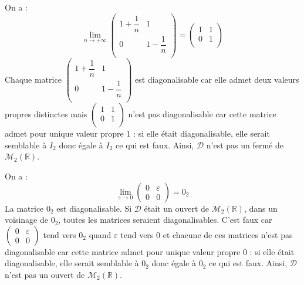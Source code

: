 \documentclass[a4paper,10pt]{report}
\begin{document}
\corr On a :
$$ \lim_{n \rightarrow + \infty} \begin{pmatrix}
1+ \dfrac{1}{n} & 1 \\
0 & 1- \dfrac{1}{n} \\
\end{pmatrix} = \begin{pmatrix}
1 & 1 \\
0 & 1 \\
\end{pmatrix}$$
Chaque matrice $\begin{pmatrix}
1+ \dfrac{1}{n} & 1 \\
0 & 1- \dfrac{1}{n} \\
\end{pmatrix}$ est diagonalisable car elle admet deux valeurs propres distinctes mais $\begin{pmatrix}
1 & 1 \\
0 & 1 \\
\end{pmatrix}$ n'est pas diagonalisable car cette matrice admet pour unique valeur propre $1$ : si elle était diagonalisable, elle serait semblable à $I_2$ donc égale à $I_2$ ce qui est faux. Ainsi, $\mathcal{D}$ n'est pas un fermé de $\mathcal{M}_2(\mathbb{R})$.

\medskip

\noindent On a : 
$$ \lim_{\varepsilon \rightarrow 0} \begin{pmatrix}
0 & \varepsilon \\
0 & 0 
\end{pmatrix} = 0_2$$
La matrice $0_2$ est diagonalisable. Si $\mathcal{D}$ était un ouvert de $\mathcal{M}_2(\mathbb{R})$, dans un voisinage de $0_2$, toutes les matrices seraient diagonalisables. C'est faux car $\begin{pmatrix}
0 & \varepsilon \\
0 & 0 
\end{pmatrix}$ tend vers $0_2$ quand $\varepsilon$ tend vers $0$ et chacune de ces matrices n'est pas diagonalisable car cette matrice admet pour unique valeur propre $0$ : si elle était diagonalisable, elle serait semblable à $0_2$ donc égale à $0_2$ ce qui est faux. Ainsi, $\mathcal{D}$ n'est pas un ouvert de $\mathcal{M}_2(\mathbb{R})$.
\end{document}
